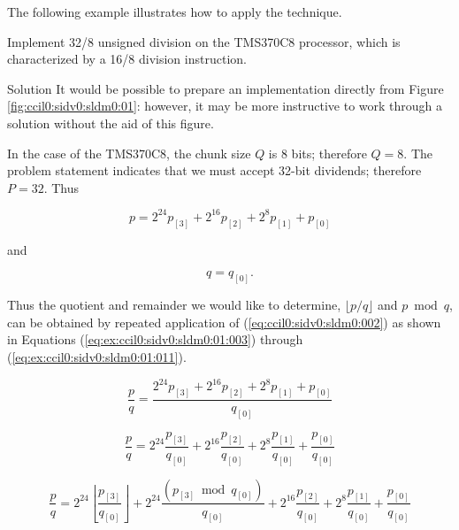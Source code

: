 The following example illustrates how to apply the technique.

\begin{vworkexamplestatement}
\label{ex:ccil0:sidv0:sldm0:01}
Implement 32/8 unsigned division on the TMS370C8 processor, which is
characterized by a 16/8 division instruction.
\end{vworkexamplestatement}
\begin{vworkexampleparsection}{Solution}
It would be possible to prepare an implementation directly from
Figure \ref{fig:ccil0:sidv0:sldm0:01}:  however, it may be 
more instructive to work through a solution without the
aid of this figure.

In the case of the TMS370C8, the chunk size $Q$ is 8 bits; therefore
$Q=8$.  The problem statement indicates that we must accept 32-bit dividends;
therefore $P=32$.  Thus

\begin{equation}
\label{eq:ex:ccil0:sidv0:sldm0:01:001}
p = 2^{24} p_{[3]} + 2^{16} p_{[2]} + 2^{8} p_{[1]} + p_{[0]}
\end{equation}

\noindent{}and

\begin{equation}
\label{eq:ex:ccil0:sidv0:sldm0:01:002}
q = q_{[0]} .
\end{equation}

\noindent{}Thus the quotient and remainder we would like to determine,
$\lfloor p/q \rfloor$ and $p \bmod q$, can be obtained by repeated
application of (\ref{eq:ccil0:sidv0:sldm0:002}) as shown
in Equations (\ref{eq:ex:ccil0:sidv0:sldm0:01:003}) 
through (\ref{eq:ex:ccil0:sidv0:sldm0:01:011}).

\begin{equation}
\label{eq:ex:ccil0:sidv0:sldm0:01:003}
\frac{p}{q} 
=
\frac{2^{24} p_{[3]} + 2^{16} p_{[2]} + 2^{8} p_{[1]} + p_{[0]}}{q_{[0]}}
\end{equation}

\begin{equation}
\label{eq:ex:ccil0:sidv0:sldm0:01:004}
\frac{p}{q} 
=
2^{24} \frac{p_{[3]}}{q_{[0]}}
+
2^{16} \frac{p_{[2]}}{q_{[0]}}
+
2^{8} \frac{p_{[1]}}{q_{[0]}}
+
\frac{p_{[0]}}{q_{[0]}}
\end{equation}

\begin{equation}
\label{eq:ex:ccil0:sidv0:sldm0:01:005}
\frac{p}{q} 
=
2^{24} \left\lfloor{\frac{p_{[3]}}{q_{[0]}}}\right\rfloor
+
2^{24} \frac{(p_{[3]} \bmod q_{[0]})}{q_{[0]}}
+
2^{16} \frac{p_{[2]}}{q_{[0]}}
+
2^{8} \frac{p_{[1]}}{q_{[0]}}
+
\frac{p_{[0]}}{q_{[0]}}
\end{equation}


\end{vworkexampleparsection}
